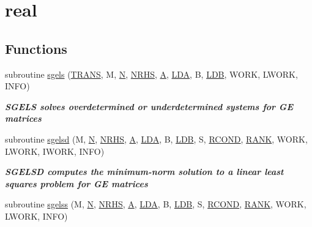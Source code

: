 \hypertarget{group__realGEsolve}{}\section{real}
\label{group__realGEsolve}
\subsection*{Functions}
\begin{DoxyCompactItemize}
\item 
subroutine \hyperlink{group__realGEsolve_ga166c189c7bcd808a9468c05e53da816f}{sgels} (\hyperlink{superlu__enum__consts_8h_a0c4e17b2d5cea33f9991ccc6a6678d62a1f61e3015bfe0f0c2c3fda4c5a0cdf58}{T\+R\+A\+N\+S}, M, \hyperlink{polmisc_8c_a0240ac851181b84ac374872dc5434ee4}{N}, \hyperlink{example__user_8c_aa0138da002ce2a90360df2f521eb3198}{N\+R\+H\+S}, \hyperlink{classA}{A}, \hyperlink{example__user_8c_ae946da542ce0db94dced19b2ecefd1aa}{L\+D\+A}, B, \hyperlink{example__user_8c_a50e90a7104df172b5a89a06c47fcca04}{L\+D\+B}, W\+O\+R\+K, L\+W\+O\+R\+K, I\+N\+F\+O)
\begin{DoxyCompactList}\small\item\em {\bfseries  S\+G\+E\+L\+S solves overdetermined or underdetermined systems for G\+E matrices} \end{DoxyCompactList}\item 
subroutine \hyperlink{group__realGEsolve_gabc655f9cb0f6cfff81b3cafc03c41dcb}{sgelsd} (M, \hyperlink{polmisc_8c_a0240ac851181b84ac374872dc5434ee4}{N}, \hyperlink{example__user_8c_aa0138da002ce2a90360df2f521eb3198}{N\+R\+H\+S}, \hyperlink{classA}{A}, \hyperlink{example__user_8c_ae946da542ce0db94dced19b2ecefd1aa}{L\+D\+A}, B, \hyperlink{example__user_8c_a50e90a7104df172b5a89a06c47fcca04}{L\+D\+B}, S, \hyperlink{superlu__enum__consts_8h_af00a42ecad444bbda75cde1b64bd7e72a9b5c151728d8512307565994c89919d5}{R\+C\+O\+N\+D}, \hyperlink{splinemodule_8c_a3a88bcc63386de30443dacede2e01847}{R\+A\+N\+K}, W\+O\+R\+K, L\+W\+O\+R\+K, I\+W\+O\+R\+K, I\+N\+F\+O)
\begin{DoxyCompactList}\small\item\em {\bfseries  S\+G\+E\+L\+S\+D computes the minimum-\/norm solution to a linear least squares problem for G\+E matrices} \end{DoxyCompactList}\item 
subroutine \hyperlink{group__realGEsolve_ga206e3084597d088b31dc054a69aec93f}{sgelss} (M, \hyperlink{polmisc_8c_a0240ac851181b84ac374872dc5434ee4}{N}, \hyperlink{example__user_8c_aa0138da002ce2a90360df2f521eb3198}{N\+R\+H\+S}, \hyperlink{classA}{A}, \hyperlink{example__user_8c_ae946da542ce0db94dced19b2ecefd1aa}{L\+D\+A}, B, \hyperlink{example__user_8c_a50e90a7104df172b5a89a06c47fcca04}{L\+D\+B}, S, \hyperlink{superlu__enum__consts_8h_af00a42ecad444bbda75cde1b64bd7e72a9b5c151728d8512307565994c89919d5}{R\+C\+O\+N\+D}, \hyperlink{splinemodule_8c_a3a88bcc63386de30443dacede2e01847}{R\+A\+N\+K}, W\+O\+R\+K, L\+W\+O\+R\+K, I\+N\+F\+O)

\end{DoxyCompactItemize}
